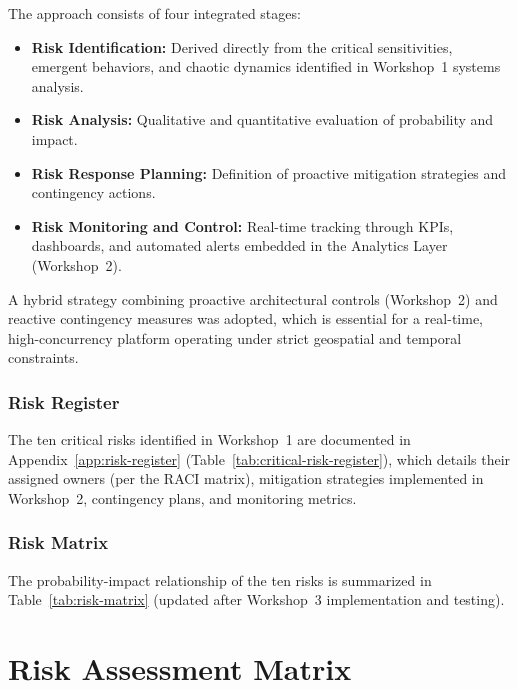\documentclass[9pt,conference]{IEEEtran}
\begin{document}
The approach consists of four integrated stages:
\begin{itemize}
    \item \textbf{Risk Identification:} Derived directly from the critical sensitivities, emergent behaviors, and chaotic dynamics identified in Workshop~1 systems analysis.
    \item \textbf{Risk Analysis:} Qualitative and quantitative evaluation of probability and impact.
    \item \textbf{Risk Response Planning:} Definition of proactive mitigation strategies and contingency actions.
    \item \textbf{Risk Monitoring and Control:} Real-time tracking through KPIs, dashboards, and automated alerts embedded in the Analytics Layer (Workshop~2).
\end{itemize}

A hybrid strategy combining proactive architectural controls (Workshop~2) and reactive contingency measures was adopted, which is essential for a real-time, high-concurrency platform operating under strict geospatial and temporal constraints.

\subsubsection{Risk Register}

The ten critical risks identified in Workshop~1 are documented in Appendix~\ref{app:risk-register} (Table~\ref{tab:critical-risk-register}), which details their assigned owners (per the RACI matrix), mitigation strategies implemented in Workshop~2, contingency plans, and monitoring metrics.

\subsubsection{Risk Matrix}

The probability-impact relationship of the ten risks is summarized in Table~\ref{tab:risk-matrix} (updated after Workshop~3 implementation and testing).

\section{Risk Assessment Matrix}
\label{app:risk-matrix-section}
\end{document}
